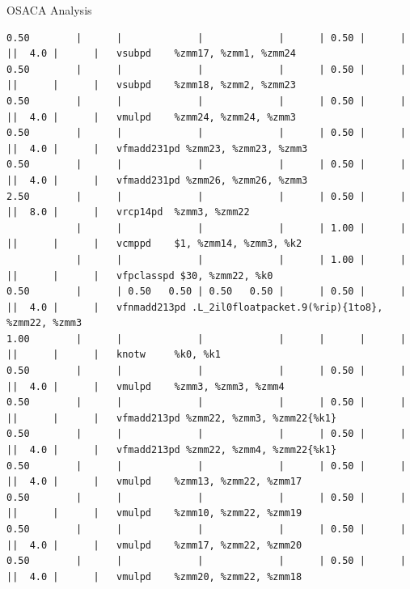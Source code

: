 \documentclass[aspectratio=169,t]{beamer}
\begin{document}
\begin{frame}[fragile]{OSACA Analysis}
\begin{lstlisting}[basicstyle=\tt\fontsize{4pt}{6pt}\selectfont]
0.50        |      |             |             |      | 0.50 |      |      ||  4.0 |      |   vsubpd    %zmm17, %zmm1, %zmm24
0.50        |      |             |             |      | 0.50 |      |      ||      |      |   vsubpd    %zmm18, %zmm2, %zmm23
0.50        |      |             |             |      | 0.50 |      |      ||  4.0 |      |   vmulpd    %zmm24, %zmm24, %zmm3
0.50        |      |             |             |      | 0.50 |      |      ||  4.0 |      |   vfmadd231pd %zmm23, %zmm23, %zmm3
0.50        |      |             |             |      | 0.50 |      |      ||  4.0 |      |   vfmadd231pd %zmm26, %zmm26, %zmm3
2.50        |      |             |             |      | 0.50 |      |      ||  8.0 |      |   vrcp14pd  %zmm3, %zmm22
            |      |             |             |      | 1.00 |      |      ||      |      |   vcmppd    $1, %zmm14, %zmm3, %k2
            |      |             |             |      | 1.00 |      |      ||      |      |   vfpclasspd $30, %zmm22, %k0
0.50        |      | 0.50   0.50 | 0.50   0.50 |      | 0.50 |      |      ||  4.0 |      |   vfnmadd213pd .L_2il0floatpacket.9(%rip){1to8}, %zmm22, %zmm3
1.00        |      |             |             |      |      |      |      ||      |      |   knotw     %k0, %k1
0.50        |      |             |             |      | 0.50 |      |      ||  4.0 |      |   vmulpd    %zmm3, %zmm3, %zmm4
0.50        |      |             |             |      | 0.50 |      |      ||      |      |   vfmadd213pd %zmm22, %zmm3, %zmm22{%k1}
0.50        |      |             |             |      | 0.50 |      |      ||  4.0 |      |   vfmadd213pd %zmm22, %zmm4, %zmm22{%k1}
0.50        |      |             |             |      | 0.50 |      |      ||  4.0 |      |   vmulpd    %zmm13, %zmm22, %zmm17
0.50        |      |             |             |      | 0.50 |      |      ||      |      |   vmulpd    %zmm10, %zmm22, %zmm19
0.50        |      |             |             |      | 0.50 |      |      ||  4.0 |      |   vmulpd    %zmm17, %zmm22, %zmm20
0.50        |      |             |             |      | 0.50 |      |      ||  4.0 |      |   vmulpd    %zmm20, %zmm22, %zmm18
    \end{lstlisting}
  \end{frame}
\end{document}
